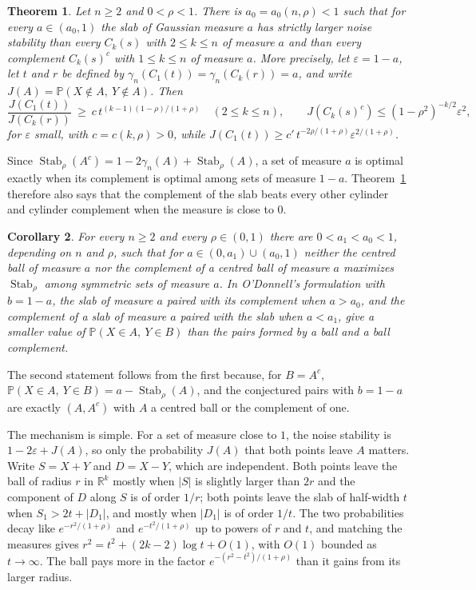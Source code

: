 \documentclass[11pt]{amsart}
\newtheorem{theorem}{Theorem}[section]
\newtheorem{corollary}[theorem]{Corollary}
\theoremstyle{remark}
\newcommand{\R}{\mathbb{R}}
\newcommand{\Prob}{\mathbb{P}}
\newcommand{\Stab}{\operatorname{Stab}_\rho}
\begin{document}
\begin{theorem}\label{thm:main}
Let $n\ge2$ and $0<\rho<1$. There is $a_0=a_0(n,\rho)<1$ such that for every $a\in(a_0,1)$ the slab of Gaussian
measure $a$ has strictly larger noise stability than every $C_k(s)$ with $2\le k\le n$ of measure $a$ and than every
complement $C_k(s)^c$ with $1\le k\le n$ of measure $a$. More precisely, let $\varepsilon=1-a$, let $t$ and $r$ be
defined by $\gamma_n(C_1(t))=\gamma_n(C_k(r))=a$, and write $J(A)=\Prob(X\notin A,\ Y\notin A)$. Then
\begin{equation}\label{eq:rates}
\frac{J(C_1(t))}{J(C_k(r))}\ \ge\ c\,t^{(k-1)(1-\rho)/(1+\rho)}\quad(2\le k\le n),\qquad
J(C_k(s)^c)\le(1-\rho^2)^{-k/2}\varepsilon^2,
\end{equation}
for $\varepsilon$ small, with $c=c(k,\rho)>0$, while $J(C_1(t))\ge c'\,t^{-2\rho/(1+\rho)}\varepsilon^{2/(1+\rho)}$.
\end{theorem}

Since $\Stab(A^c)=1-2\gamma_n(A)+\Stab(A)$, a set of measure $a$ is optimal exactly when its complement is optimal
among sets of measure $1-a$. Theorem~\ref{thm:main} therefore also says that the complement of the slab beats every
other cylinder and cylinder complement when the measure is close to $0$.

\begin{corollary}\label{cor:false}
For every $n\ge2$ and every $\rho\in(0,1)$ there are $0<a_1<a_0<1$, depending on $n$ and $\rho$, such that for
$a\in(0,a_1)\cup(a_0,1)$ neither the centred ball of measure $a$ nor the complement of a centred ball of measure $a$
maximizes $\Stab$ among symmetric sets of measure $a$. In O'Donnell's formulation with $b=1-a$, the slab of measure $a$
paired with its complement when $a>a_0$, and the complement of a slab of measure $a$ paired with the slab when
$a<a_1$, give a smaller value of $\Prob(X\in A,\ Y\in B)$ than the pairs formed by a ball and a ball complement.
\end{corollary}

The second statement follows from the first because, for $B=A^c$, $\Prob(X\in A,\ Y\in B)=a-\Stab(A)$, and the
conjectured pairs with $b=1-a$ are exactly $(A,A^c)$ with $A$ a centred ball or the complement of one.

The mechanism is simple. For a set of measure close to $1$, the noise stability is $1-2\varepsilon+J(A)$, so only the
probability $J(A)$ that both points leave $A$ matters. Write $S=X+Y$ and $D=X-Y$, which are independent. Both points
leave the ball of radius $r$ in $\R^k$ mostly when $|S|$ is slightly larger than $2r$ and the component of $D$ along $S$
is of order $1/r$; both points leave the slab of half-width $t$ when $S_1>2t+|D_1|$, and mostly when $|D_1|$ is of order
$1/t$. The two probabilities decay like $e^{-r^2/(1+\rho)}$ and $e^{-t^2/(1+\rho)}$ up to powers of $r$ and $t$, and
matching the measures gives $r^2=t^2+(2k-2)\log t+O(1)$, with $O(1)$ bounded as $t\to\infty$. The ball pays more in the
factor $e^{-(r^2-t^2)/(1+\rho)}$ than it gains from its larger radius.
\end{document}
